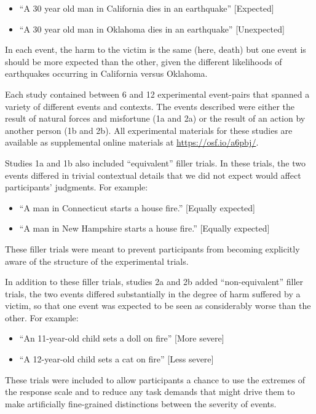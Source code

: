 \documentclass[10pt, letterpaper]{article}
\begin{document}
\begin{itemize}
\item
  ``A 30 year old man in California dies in an earthquake''
  {[}Expected{]}
\item
  ``A 30 year old man in Oklahoma dies in an earthquake''
  {[}Unexpected{]}
\end{itemize}

In each event, the harm to the victim is the same (here, death) but one
event is should be more expected than the other, given the different
likelihoods of earthquakes occurring in California versus Oklahoma.

Each study contained between 6 and 12 experimental event-pairs that
spanned a variety of different events and contexts. The events described
were either the result of natural forces and misfortune (1a and 2a) or
the result of an action by another person (1b and 2b). All experimental
materials for these studies are available as supplemental online
materials at \url{https://osf.io/a6pbj/}.

Studies 1a and 1b also included ``equivalent'' filler trials. In these
trials, the two events differed in trivial contextual details that we
did not expect would affect participants' judgments. For example:

\begin{itemize}
\item
  ``A man in Connecticut starts a house fire.'' {[}Equally expected{]}
\item
  ``A man in New Hampshire starts a house fire.'' {[}Equally expected{]}
\end{itemize}

These filler trials were meant to prevent participants from becoming
explicitly aware of the structure of the experimental trials.

In addition to these filler trials, studies 2a and 2b added
``non-equivalent'' filler trials, the two events differed substantially
in the degree of harm suffered by a victim, so that one event was
expected to be seen as considerably worse than the other. For example:

\begin{itemize}
\item
  ``An 11-year-old child sets a doll on fire'' {[}More severe{]}
\item
  ``A 12-year-old child sets a cat on fire'' {[}Less severe{]}
\end{itemize}

These trials were included to allow participants a chance to use the
extremes of the response scale and to reduce any task demands that might
drive them to make artificially fine-grained distinctions between the
severity of events.
\end{document}

